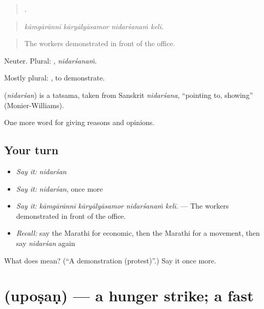 \begin{quote}
   .
\end{quote}

\begin{quote}
\emph{kāmgārānnī kāryālyāsamor nidarśanaṁ kelī.}
\end{quote}

\begin{quote}
The workers demonstrated in front of the office.
\end{quote}

Neuter. Plural: , \emph{nidarśanaṁ}.

Mostly plural:  , to demonstrate.

\begin{cousinweb}
\textbf{} (\emph{nidarśan}) is a tatsama, taken from Sanskrit \emph{nidarśana}, \textquotedblleft{}pointing to, showing\textquotedblright{} (Monier-Williams).
\end{cousinweb}

\begin{grammarlens}[title={What you've built}]
One more word for giving reasons and opinions.
\end{grammarlens}

\subsection*{Your turn}
\begin{itemize}
\raggedright
  \item \emph{Say it:} \emph{nidarśan}
  \item \emph{Say it:} \emph{nidarśan}, once more
  \item \emph{Say it:} \emph{kāmgārānnī kāryālyāsamor nidarśanaṁ kelī.} — The workers demonstrated in front of the office.
  \item \emph{Recall:} say the Marathi for economic, then the Marathi for a movement, then say \emph{nidarśan} again
\end{itemize}

\begin{tcolorbox}[breakable,colback=teal!4,colframe=teal!35!black,title={Before you move on}]
What does  mean? (\textquotedblleft{}A demonstration (protest)\textquotedblright{}.) Say it once more.
\end{tcolorbox}
\section[\texorpdfstring{\mr{उपोषण} (upoṣaṇ)}{उपोषण (upoṣaṇ)}]{ (upoṣaṇ) — a hunger strike; a fast}

